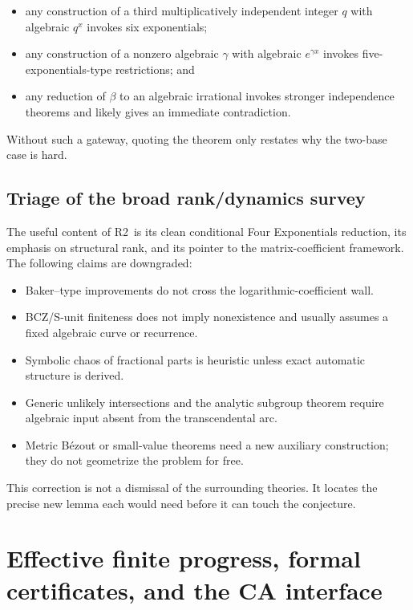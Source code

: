 \documentclass[10pt,letterpaper]{article}
\newcommand{\Rtwo}{\textsf{R2}}
\begin{document}
\begin{itemize}
\item any construction of a third multiplicatively independent integer \(q\) with algebraic
\(q^x\) invokes six exponentials;
\item any construction of a nonzero algebraic \(\gamma\) with algebraic
\(e^{\gamma x}\) invokes five-exponentials-type restrictions; and
\item any reduction of \(\beta\) to an algebraic irrational invokes stronger independence
theorems and likely gives an immediate contradiction.
\end{itemize}

Without such a gateway, quoting the theorem only restates why the two-base case is hard.

\subsection{Triage of the broad rank/dynamics survey}

The useful content of \Rtwo\ is its clean conditional Four Exponentials reduction, its
emphasis on structural rank, and its pointer to the matrix-coefficient framework.  The
following claims are downgraded:

\begin{itemize}
\item Baker--type improvements do not cross the logarithmic-coefficient wall.
\item BCZ/S-unit finiteness does not imply nonexistence and usually assumes a fixed
algebraic curve or recurrence.
\item Symbolic chaos of fractional parts is heuristic unless exact automatic structure is
derived.
\item Generic unlikely intersections and the analytic subgroup theorem require algebraic
input absent from the transcendental arc.
\item Metric B\'ezout or small-value theorems need a new auxiliary construction; they do not
geometrize the problem for free.
\end{itemize}

This correction is not a dismissal of the surrounding theories.  It locates the precise
new lemma each would need before it can touch the conjecture.

\clearpage
\section{Effective finite progress, formal certificates, and the CA interface}
\label{sec:finite}
\end{document}
